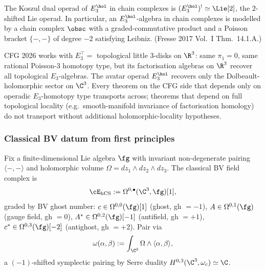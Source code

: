 \begin{proposition}
\label{prop:e3-hol-koszul}
The Koszul dual operad of $E_3^{\hol}$ in chain complexes is $(E_3^{\hol})^! \simeq \Lie[2]$, the $2$-shifted Lie operad. In particular, an $E_3^{\hol}$-algebra in chain complexes is modelled by a chain complex $\obsc$ with a graded-commutative product and a Poisson bracket $\{-,-\}$ of degree $-2$ satisfying Leibniz. (Fresse 2017 Vol.~I Thm.~14.1.A.)
\end{proposition}

\begin{remark}
\label{rem:cfg-vs-avatar-operad}
CFG 2026 works with $E_3^{\top} = $ topological little $3$-disks on $\R^3$: same $\pi_1 = 0$, same rational Poisson-$3$ homotopy type, but its factorisation algebras on $\R^3$ recover all topological $E_3$-algebras. The avatar operad $E_3^{\hol}$ recovers only the Dolbeault-holomorphic sector on $\C^3$. Every theorem on the CFG side that depends only on operadic $E_3$-homotopy type transports across; theorems that depend on full topological locality (e.g.\ smooth-manifold invariance of factorisation homology) do not transport without additional holomorphic-locality hypotheses.
\end{remark}

\subsubsection{Classical BV datum from first principles}
\label{sssec:classical-BV-datum}

\begin{definition}
\label{def:hCS-BV-avatar}
Fix a finite-dimensional Lie algebra $\fg$ with invariant non-degenerate pairing $\langle -, - \rangle$ and holomorphic volume $\Omega = dz_1 \wedge dz_2 \wedge dz_3$. The classical BV field complex is
\[
\cE_{\hCS} := \Omega^{0,\bullet}(\C^3, \fg)[1],
\]
graded by BV ghost number: $c \in \Omega^{0,0}(\fg)[1]$ (ghost, gh $= -1$), $A \in \Omega^{0,1}(\fg)$ (gauge field, gh $= 0$), $A^* \in \Omega^{0,2}(\fg)[-1]$ (antifield, gh $= +1$), $c^* \in \Omega^{0,3}(\fg)[-2]$ (antighost, gh $= +2$). Pair via
\[
\omega(\alpha, \beta) := \int_{\C^3} \Omega \wedge \langle \alpha, \beta \rangle,
\]
a $(-1)$-shifted symplectic pairing by Serre duality $H^{0,3}(\C^3, \omega_c) \simeq \C$.
\end{definition}

